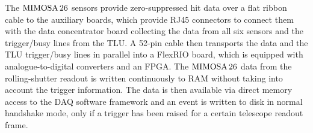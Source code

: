 The $\textrm{MIMOSA\,26}$ sensors provide zero-suppressed hit data over a flat ribbon cable to the auxiliary boards, which provide RJ45 connectors to connect them with the
 data concentrator board collecting the data from all six sensors and the trigger/busy lines from the TLU. 
A 52-pin cable then transports the data and the TLU trigger/busy lines in parallel into a FlexRIO board, which is equipped with analogue-to-digital converters and an FPGA. 
The $\textrm{MIMOSA\,26}$ data from the rolling-shutter readout is written continuously to RAM without taking into account the trigger information. 
The data is then available via direct memory access to the DAQ software framework and an event is written to disk in normal handshake mode, only if a trigger has been raised for a certain telescope readout frame. 

